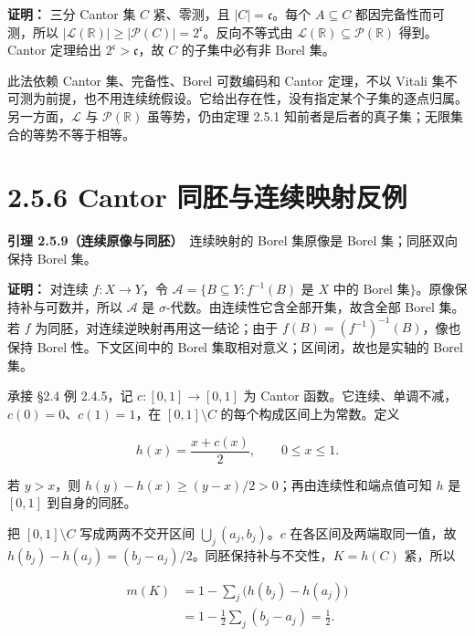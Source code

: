 \documentclass[11pt,a4paper]{article}
\begin{document}
\textbf{证明：} 三分 Cantor 集 \(C\) 紧、零测，且
\(|C|=\mathfrak c\)。每个 \(A\subseteq C\) 都因完备性而可测，所以
\(|\mathcal L(\mathbb R)|\ge|\mathcal P(C)|=2^{\mathfrak c}\)。反向不等式由
\(\mathcal L(\mathbb R)\subseteq\mathcal P(\mathbb R)\) 得到。Cantor
定理给出 \(2^{\mathfrak c}>\mathfrak c\)，故 \(C\) 的子集中必有非 Borel
集。

此法依赖 Cantor 集、完备性、Borel 可数编码和 Cantor 定理，不以 Vitali
集不可测为前提，也不用连续统假设。它给出存在性，没有指定某个子集的逐点归属。另一方面，\(\mathcal L\)
与 \(\mathcal P(\mathbb R)\) 虽等势，仍由定理 2.5.1
知前者是后者的真子集；无限集合的等势不等于相等。

\section[\S{}2.5.6 Cantor
同胚与连续映射反例]{2.5.6 Cantor
同胚与连续映射反例}\label{cantor-ux540cux80daux4e0eux8fdeux7eedux6620ux5c04ux53cdux4f8b}

\textbf{引理 2.5.9（连续原像与同胚）}　连续映射的 Borel 集原像是 Borel
集；同胚双向保持 Borel 集。

\textbf{证明：} 对连续 \(f:X\to Y\)，令
\(\mathcal A=\{B\subseteq Y:f^{-1}(B)\text{ 是 }X\text{ 中的 Borel 集}\}\)。原像保持补与可数并，所以
\(\mathcal A\) 是 \(\sigma\)-代数。由连续性它含全部开集，故含全部 Borel
集。若 \(f\) 为同胚，对连续逆映射再用这一结论；由于
\(f(B)=(f^{-1})^{-1}(B)\)，像也保持 Borel 性。下文区间中的 Borel
集取相对意义；区间闭，故也是实轴的 Borel 集。

承接 §2.4 例 2.4.5，记 \(c:[0,1]\to[0,1]\) 为 Cantor
函数。它连续、单调不减，\(c(0)=0\)、\(c(1)=1\)，在 \([0,1]\setminus C\)
的每个构成区间上为常数。定义

\begin{equation*}
h(x)=\frac{x+c(x)}2,\qquad 0\le x\le1.
\tag{2.5.10}
\end{equation*}

若 \(y>x\)，则 \(h(y)-h(x)\ge(y-x)/2>0\)；再由连续性和端点值可知 \(h\)
是 \([0,1]\) 到自身的同胚。

把 \([0,1]\setminus C\) 写成两两不交开区间 \(\bigcup_j(a_j,b_j)\)。\(c\)
在各区间及两端取同一值，故
\(h(b_j)-h(a_j)=(b_j-a_j)/2\)。同胚保持补与不交性，\(K=h(C)\) 紧，所以

\begin{equation*}
\begin{aligned}
m(K)&=1-\sum_j\bigl(h(b_j)-h(a_j)\bigr)\\
&=1-\frac12\sum_j(b_j-a_j)=\frac12.
\end{aligned}
\tag{2.5.11}
\end{equation*}
\end{document}
